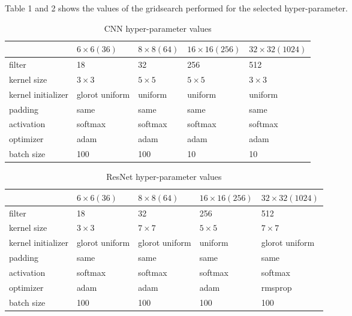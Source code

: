 Table 1 and 2 shows the values of the gridsearch performed for the selected hyper-parameter.
\begin{table}
\caption{CNN hyper-parameter values}
\setlength{\tabcolsep}{3pt}
\begin{tabular}{|p{50pt}|p{35pt}|p{35pt}|p{47pt}|p{48pt}|}
\hline
 & $6 \times 6 (36)$ & $8 \times 8 (64)$ & $16 \times 16 (256)$ & $32 \times 32 (1024)$ \\
\hline
\hline
filter & 18 & 32 & 256 & 512 \\
\hline
kernel size & $3 \times 3$ & $5 \times 5$ & $5 \times 5$ & $3 \times 3$ \\
\hline
kernel initializer & glorot uniform & uniform & uniform & uniform  \\
\hline
padding & same & same & same & same  \\
\hline
activation & softmax & softmax & softmax & softmax \\
\hline
optimizer & adam & adam & adam & adam \\
\hline
batch size & 100 & 100 & 10 & 10 \\
\hline
\end{tabular}
\label{tab1}
\end{table}

\begin{table}
\caption{ResNet hyper-parameter values}
\setlength{\tabcolsep}{3pt}
\begin{tabular}{|p{50pt}|p{35pt}|p{35pt}|p{47pt}|p{48pt}|}
\hline
 & $6 \times 6 (36)$ & $8 \times 8 (64)$ & $16 \times 16 (256)$ & $32 \times 32 (1024)$ \\
\hline
\hline
filter & 18 & 32 & 256 & 512 \\
\hline
kernel size & $3 \times 3$ & $7 \times 7$ & $5 \times 5$ & $7 \times 7$ \\
\hline
kernel initializer & glorot uniform & glorot uniform & uniform & glorot uniform  \\
\hline
padding & same & same & same & same  \\
\hline
activation & softmax & softmax & softmax & softmax \\
\hline
optimizer & adam & adam & adam & rmsprop \\
\hline
batch size & 100 & 100 & 100 & 100 \\
\hline
\end{tabular}
\label{tab2}
\end{table}

